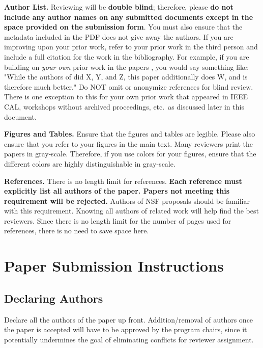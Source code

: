 \documentclass[pageno]{jpaper}
\begin{document}
\noindent\textbf{Author List.}  Reviewing will be \textbf{double blind};
therefore, please \textbf{do not include any author names on any submitted
documents except in the space provided on the submission form}.  You must
also ensure that the metadata included in the PDF does not give away the
authors. If you are improving upon your prior work, refer to your prior
work in the third person and include a full citation for the work in the
bibliography.  For example, if you are building on {\em your own} prior
work in the papers \cite{nicepaper1,nicepaper2,nicepaper3}, you would say
something like: "While the authors of
\cite{nicepaper1,nicepaper2,nicepaper3} did X, Y, and Z, this paper
additionally does W, and is therefore much better."  Do NOT omit or
anonymize references for blind review.  There is one exception to this for
your own prior work that appeared in IEEE CAL, workshops without archived
proceedings, etc.\, as discussed later in this document.

\noindent\textbf{Figures and Tables.} Ensure that the figures and tables
are legible.  Please also ensure that you refer to your figures in the main
text.  Many reviewers print the papers in gray-scale. Therefore, if you use
colors for your figures, ensure that the different colors are highly
distinguishable in gray-scale.

\noindent\textbf{References.}  There is no length limit for references.
{\bf Each reference must explicitly list all authors of the paper.  Papers
not meeting this requirement will be rejected.} Authors of NSF proposals
should be familiar with this requirement. Knowing all authors of related
work will help find the best reviewers. Since there is no length limit
for the number of pages used for references, there is no need to save space
here.

\section{Paper Submission Instructions}

\subsection{Declaring Authors}

Declare all the authors of the paper up front. Addition/removal of authors
once the paper is accepted will have to be approved by the program chairs,
since it potentially undermines the goal of eliminating conflicts for
reviewer assignment.
\end{document}
